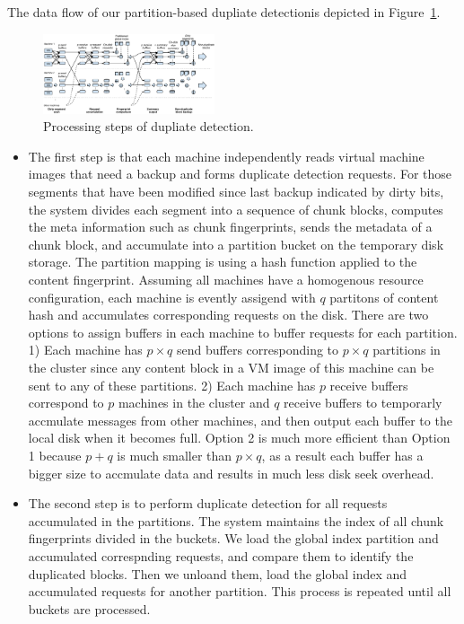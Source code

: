 The data flow of our partition-based  dupliate detectionis depicted in
Figure~\ref{fig:flow}. 
\begin{figure}
\centering
\includegraphics[width=0.45\textwidth]{steps.pdf}
\caption{ Processing steps of dupliate detection.}
\label{fig:flow}
\end{figure}

\begin{itemize}
\item
The first step is that each machine independently reads  
virtual machine images that need a backup
and forms duplicate  detection requests. For those segments that have been modified since last backup indicated by 
dirty bits,  the system divides  each segment into a sequence of chunk blocks,  computes the meta 
information such as chunk fingerprints,  sends the metadata of a chunk block, and accumulate  into 
a partition bucket on the temporary disk storage. 
The partition mapping is using a hash function applied to the content fingerprint. 
Assuming all machines have a  homogenous resource configuration, each machine is evently  assigend with
$q$ partitons of content hash and accumulates corresponding requests on the disk. 
There are two options to assign buffers in each machine to buffer requests for each partition.
1) Each machine has  $p\times q$ send buffers corresponding to $p\times q$ partitions in the cluster
since any content block in a VM image of this machine can be sent to any of these partitions.
2) Each machine has $p$ receive buffers correspond to $p$ machines in the cluster and $q$ receive 
buffers to temporarly accmulate messages from other machines, and then output each buffer to the local disk
when it becomes full.  Option 2 is much more efficient than Option 1 because $p+q$ is much smaller than
$p\times q$, as a result each buffer has a bigger size to accmulate data and results in 
much less disk seek overhead.

\item
The second step is to perform duplicate detection for  all requests accumulated in the partitions.  
The system maintains the index of all chunk fingerprints divided in the buckets. We load the global index partition 
and accumulated correspnding requests, and compare them to  identify the duplicated blocks.  
Then we unloand them, load the global index and accumulated requests for another partition. 
This process is repeated until all buckets are processed.


\end{itemize}

